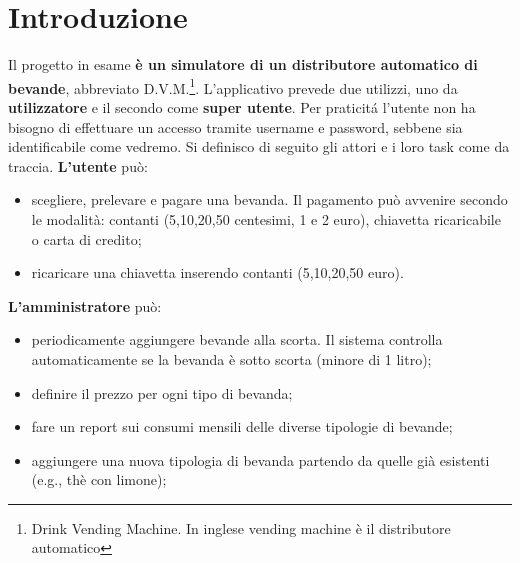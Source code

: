 \thispagestyle{headings}
\chapter{Introduzione} \label{cap0}
Il progetto in esame \textbf{\`e un simulatore di un distributore automatico di bevande}, abbreviato
D.V.M.\footnote{Drink Vending Machine. In inglese vending machine \`e il distributore automatico}.
L'applicativo prevede due utilizzi, uno da \textbf{utilizzatore} e il secondo come \textbf{super utente}.
Per praticit\'a l'utente non ha bisogno di effettuare un accesso tramite username e password, sebbene sia identificabile
come vedremo. Si definisco di seguito gli attori e i loro task come da traccia.\newline
\textbf{L'utente} pu\`o:
\begin{itemize}
    \item scegliere, prelevare e pagare una bevanda. Il pagamento pu\`o avvenire
    secondo le modalit\`a: contanti (5,10,20,50 centesimi, 1 e 2 euro), chiavetta
    ricaricabile o carta di credito;
    \item ricaricare una chiavetta inserendo contanti (5,10,20,50 euro).
\end{itemize}

\textbf{L'amministratore} pu\`o:
\begin{itemize}
    \item periodicamente aggiungere bevande alla scorta. Il sistema controlla automaticamente se la bevanda
    \`e sotto scorta (minore di 1 litro);
    \item  definire il prezzo per ogni tipo di bevanda;
    \item  fare un report sui consumi mensili delle diverse tipologie di bevande;
    \item aggiungere una nuova tipologia di bevanda partendo da quelle gi\`a esistenti (e.g., th\`e con limone);
\end{itemize}